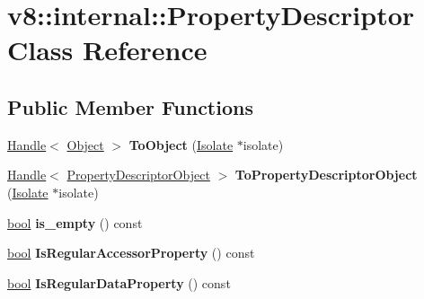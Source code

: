 \hypertarget{classv8_1_1internal_1_1PropertyDescriptor}{}\section{v8\+:\+:internal\+:\+:Property\+Descriptor Class Reference}
\label{classv8_1_1internal_1_1PropertyDescriptor}
\subsection*{Public Member Functions}
\begin{DoxyCompactItemize}
\item 
\mbox{\label{classv8_1_1internal_1_1PropertyDescriptor_af72e01c383fab1b3b629dfa597aa10c6}} 
\mbox{\hyperlink{classv8_1_1internal_1_1Handle}{Handle}}$<$ \mbox{\hyperlink{classv8_1_1internal_1_1Object}{Object}} $>$ {\bfseries To\+Object} (\mbox{\hyperlink{classv8_1_1internal_1_1Isolate}{Isolate}} $\ast$isolate)
\item 
\mbox{\label{classv8_1_1internal_1_1PropertyDescriptor_a3fbddfca2637e956648c6ac83b9bbff7}} 
\mbox{\hyperlink{classv8_1_1internal_1_1Handle}{Handle}}$<$ \mbox{\hyperlink{classv8_1_1internal_1_1PropertyDescriptorObject}{Property\+Descriptor\+Object}} $>$ {\bfseries To\+Property\+Descriptor\+Object} (\mbox{\hyperlink{classv8_1_1internal_1_1Isolate}{Isolate}} $\ast$isolate)
\item 
\mbox{\label{classv8_1_1internal_1_1PropertyDescriptor_a0ecf8d9f29dd17708cb3950761fa908f}} 
\mbox{\hyperlink{classbool}{bool}} {\bfseries is\+\_\+empty} () const
\item 
\mbox{\label{classv8_1_1internal_1_1PropertyDescriptor_af725d83d93e69b991c1e4dfe66fd201b}} 
\mbox{\hyperlink{classbool}{bool}} {\bfseries Is\+Regular\+Accessor\+Property} () const
\item 
\mbox{\label{classv8_1_1internal_1_1PropertyDescriptor_a25ca69b939791b04a97da17b886d978d}} 
\mbox{\hyperlink{classbool}{bool}} {\bfseries Is\+Regular\+Data\+Property} () const
\item 

\end{DoxyCompactItemize}
